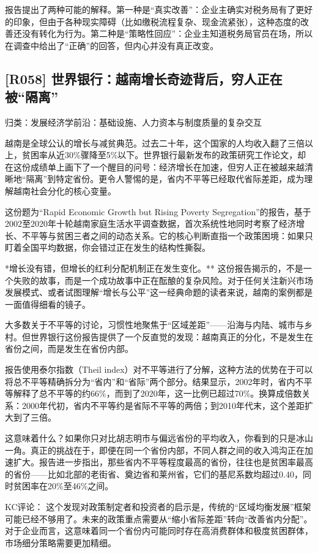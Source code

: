 \documentclass[11pt]{ctexart}
\begin{document}
报告提出了两种可能的解释。第一种是“真实改善”：企业主确实对税务局有了更好的印象，但由于各种现实障碍（比如缴税流程复杂、现金流紧张），这种态度的改善还没有转化为行为。第二种是“策略性回应”：企业主知道税务局官员在场，所以在调查中给出了“正确”的回答，但内心并没有真正改变。

\subsection{[R058] 世界银行：越南增长奇迹背后，穷人正在被“隔离”}
{\small\color{refgray}归类：发展经济学前沿：基础设施、人力资本与制度质量的复杂交互}

越南是全球公认的增长与减贫典范。过去二十年，这个国家的人均收入翻了三倍以上，贫困率从近30\%骤降至5\%以下。世界银行最新发布的政策研究工作论文，却在这份成绩单上画下了一个醒目的问号：经济增长在加速，但穷人正在被越来越清晰地“隔离”到特定省份。更令人警惕的是，省内不平等已经取代省际差距，成为理解越南社会分化的核心变量。

这份题为“Rapid Economic Growth but Rising Poverty Segregation”的报告，基于2002至2020年十轮越南家庭生活水平调查数据，首次系统性地同时考察了经济增长、不平等与贫困三者之间的动态关系。它的核心判断直指一个政策困境：如果只盯着全国平均数据，你会错过正在发生的结构性撕裂。

*增长没有错，但增长的红利分配机制正在发生变化。** 这份报告揭示的，不是一个失败的故事，而是一个成功故事中正在酝酿的复杂风险。对于任何关注新兴市场发展模式、或者试图理解“增长与公平”这一经典命题的读者来说，越南的案例都是一面值得细看的镜子。

大多数关于不平等的讨论，习惯性地聚焦于“区域差距”——沿海与内陆、城市与乡村。但世界银行这份报告提供了一个反直觉的发现：越南真正的分化，不是发生在省份之间，而是发生在省份内部。

报告使用泰尔指数（Theil index）对不平等进行了分解，这种方法的优势在于可以将总不平等精确拆分为“省内”和“省际”两个部分。结果显示，2002年时，省内不平等解释了总不平等的约66\%，而到了2020年，这一比例已超过70\%。换算成倍数关系：2000年代初，省内不平等约是省际不平等的两倍；到2010年代末，这个差距扩大到了三倍。

这意味着什么？如果你只对比胡志明市与偏远省份的平均收入，你看到的只是冰山一角。真正的挑战在于，即便在同一个省份内部，不同人群之间的收入鸿沟正在加速扩大。报告进一步指出，那些省内不平等程度最高的省份，往往也是贫困率最高的省份——比如北部的老街省、奠边省和莱州省，它们的基尼系数均超过0.40，同时贫困率在20\%至46\%之间。

KC评论： 这个发现对政策制定者和投资者的启示是，传统的“区域均衡发展”框架可能已经不够用了。未来的政策重点需要从“缩小省际差距”转向“改善省内分配”。对于企业而言，这意味着同一个省份内可能同时存在高消费群体和极度贫困群体，市场细分策略需要更加精细。
\end{document}
